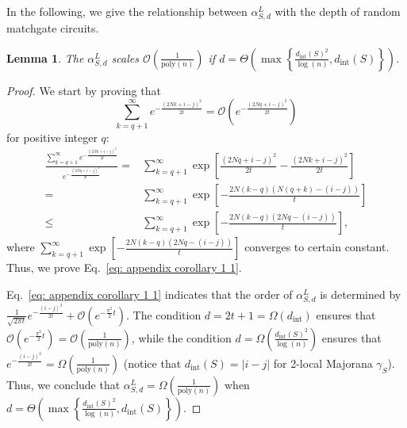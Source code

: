 \documentclass[showpacs,onecolumn,aps,prx,long bibliography,superscriptaddress,notitlepage]{revtex4-1}
\newtheorem{lemma}{Lemma}
\begin{document}
In the following, we give the relationship between $\alpha_{S,d}^L$ with the depth of random matchgate circuits.
\begin{lemma}
    \label{corollary: 1}
    The $\alpha_{S,d}^L$ scales $\mathcal{O}\left( \frac{1}{\mathrm{poly}(n)}\right)$ if $d = \Theta\left(\max\left\{ \frac{d_{\text{int}}(S)^2}{\log(n)} , d_{\text{int}}(S)\right\}\right)$.
\end{lemma}
\begin{proof}
    We start by proving that
    \begin{equation}
    \label{eq: appendix corollary 1 1}
        \sum_{k=q+1}^{\infty} e^{-\frac{(2Nk+i-j)^2}{2t}}  = \mathcal{O}\left(e^{-\frac{(2Nq+i-j)^2}{2t}}\right)
    \end{equation}
    for positive integer $q$:
    \begin{align}
        \frac{\sum_{k=q+1}^{\infty} e^{-\frac{(2Nk+i-j)^2}{2t}}}{e^{-\frac{(2Nq+i-j)^2}{2t}}} =& \sum_{k=q+1}^{\infty} \exp\left[\frac{(2Nq+i-j)^2}{2t}-\frac{(2Nk+i-j)^2}{2t} \right]\\
        =& \sum_{k=q+1}^{\infty} \exp\left[-\frac{2N(k-q)(N(q+k) -(i-j))}{t}\right] \\
        \leq& \sum_{k=q+1}^{\infty} \exp\left[-\frac{2N(k-q)(2Nq -(i-j))}{t}\right],
    \end{align}
    where $\sum_{k=q+1}^{\infty} \exp\left[-\frac{2N(k-q)(2Nq -(i-j))}{t}\right]$ converges to certain constant. Thus, we prove Eq.~\eqref{eq: appendix corollary 1 1}.

    Eq.~\eqref{eq: appendix corollary 1 1} indicates that the order of $\alpha_{S,d}^L$ is determined by $\frac{1}{\sqrt{2\pi t}}  e^{-\frac{(i-j)^2}{2t}}+\mathcal{O}\left(e^{-\frac{\pi^2}{2}t}\right).$
    The condition $d = 2t+1 = \Omega(d_{\text{int}})$ ensures that $\mathcal{O}\left(e^{-\frac{\pi^2}{2}t}\right) =\mathcal{O}\left(\frac{1}{\mathrm{poly}(n)}\right) $, while the condition $d = \Omega(\frac{d_{\text{int}}(S)^2}{\log(n)} )$ ensures that $e^{-\frac{(i-j)^2}{2t}} =\Omega\left(\frac{1}{\mathrm{poly}(n)}\right) $ (notice that $d_\text{int}(S) = |i-j|$ for 2-local Majorana $\gamma_S$). Thus, we conclude that $\alpha_{S,d}^L = \Omega\left( \frac{1}{\mathrm{poly}(n)}\right)$ when $d = \Theta\left(\max\left\{ \frac{d_{\text{int}}(S)^2}{\log(n)} , d_{\text{int}}(S)\right\}\right)$. 
    
\end{proof}
\end{document}

